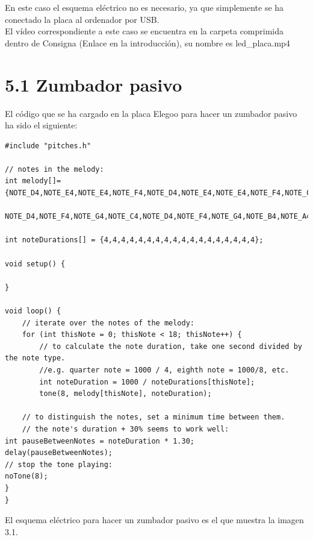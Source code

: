 	En este caso el esquema eléctrico no es necesario, ya que simplemente se ha conectado la placa al ordenador por USB.\\
	
	El vídeo correspondiente a este caso se encuentra en la carpeta comprimida dentro de Consigna (Enlace en la introducción),
	su nombre es led\_placa.mp4
	
	\section[Zumbador pasivo]{5.1 Zumbador pasivo}
	
	El código que se ha cargado en la placa Elegoo para hacer un zumbador pasivo ha sido el siguiente: 
	
	\lstset{language=C}
	\begin{lstlisting}[frame=single]
#include "pitches.h"

// notes in the melody:
int melody[]={NOTE_D4,NOTE_E4,NOTE_E4,NOTE_F4,NOTE_D4,NOTE_E4,NOTE_E4,NOTE_F4,NOTE_C4,
			  NOTE_D4,NOTE_F4,NOTE_G4,NOTE_C4,NOTE_D4,NOTE_F4,NOTE_G4,NOTE_B4,NOTE_A4};

int noteDurations[] = {4,4,4,4,4,4,4,4,4,4,4,4,4,4,4,4,4,4};

void setup() {

}

void loop() {
	// iterate over the notes of the melody:
	for (int thisNote = 0; thisNote < 18; thisNote++) {
		// to calculate the note duration, take one second divided by the note type.
		//e.g. quarter note = 1000 / 4, eighth note = 1000/8, etc.
		int noteDuration = 1000 / noteDurations[thisNote];
		tone(8, melody[thisNote], noteDuration);

	// to distinguish the notes, set a minimum time between them.
	// the note's duration + 30% seems to work well:
int pauseBetweenNotes = noteDuration * 1.30;
delay(pauseBetweenNotes);
// stop the tone playing:
noTone(8);
}
}
	\end{lstlisting}
	
	El esquema eléctrico para hacer un zumbador pasivo es el que muestra la imagen 3.1. \\
	
